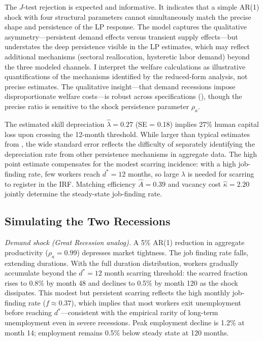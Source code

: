 \documentclass[12pt]{article}
\begin{document}
The $J$-test rejection is expected and informative. It indicates that a simple AR(1) shock with four structural parameters cannot simultaneously match the precise shape and persistence of the LP response. The model captures the qualitative asymmetry---persistent demand effects versus transient supply effects---but understates the deep persistence visible in the LP estimates, which may reflect additional mechanisms (sectoral reallocation, hysteretic labor demand) beyond the three modeled channels. I interpret the welfare calculations as illustrative quantifications of the mechanisms identified by the reduced-form analysis, not precise estimates. The qualitative insight---that demand recessions impose disproportionate welfare costs---is robust across specifications (), though the precise ratio is sensitive to the shock persistence parameter $\rho_a$.

The estimated skill depreciation $\hat{\lambda} = 0.27$ (SE = 0.18) implies 27\% human capital loss upon crossing the 12-month threshold. While larger than typical estimates from \citet{jacobson1993earnings}, the wide standard error reflects the difficulty of separately identifying the depreciation rate from other persistence mechanisms in aggregate data. The high point estimate compensates for the modest scarring incidence: with a high job-finding rate, few workers reach $d^* = 12$ months, so large $\lambda$ is needed for scarring to register in the IRF. Matching efficiency $\hat{A} = 0.39$ and vacancy cost $\hat{\kappa} = 2.20$ jointly determine the steady-state job-finding rate.

\subsection{Simulating the Two Recessions}

\textit{Demand shock (Great Recession analog).} A 5\% AR(1) reduction in aggregate productivity ($\rho_a = 0.99$) depresses market tightness. The job finding rate falls, extending durations. With the full duration distribution, workers gradually accumulate beyond the $d^* = 12$ month scarring threshold: the scarred fraction rises to 0.8\% by month 48 and declines to 0.5\% by month 120 as the shock dissipates. This modest but persistent scarring reflects the high monthly job-finding rate ($f \approx 0.37$), which implies that most workers exit unemployment before reaching $d^*$---consistent with the empirical rarity of long-term unemployment even in severe recessions. Peak employment decline is 1.2\% at month 14; employment remains 0.5\% below steady state at 120 months.
\end{document}
